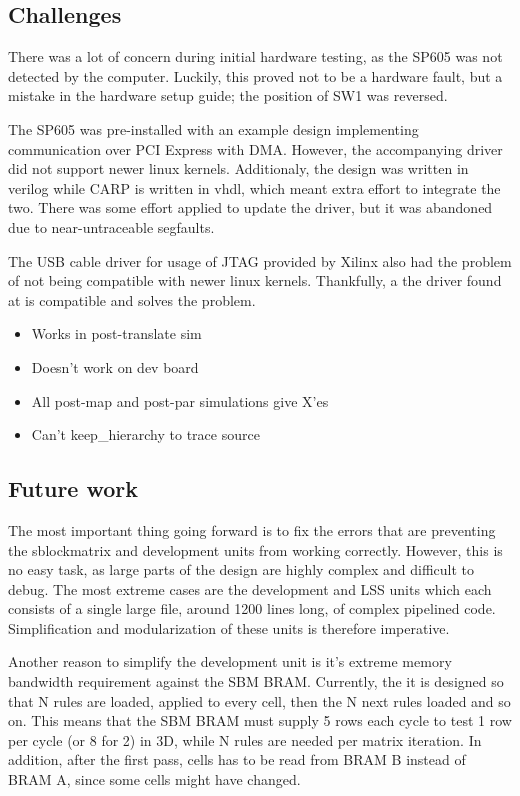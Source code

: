 \subsection{Challenges}
\label{sec:challenges}

There was a lot of concern during initial hardware testing, as the SP605 was not detected by the computer.
Luckily, this proved not to be a hardware fault, but a mistake in the hardware setup guide; the position of SW1 was reversed.

The SP605 was pre-installed with an example design implementing communication over PCI Express with DMA.
However, the accompanying driver did not support newer linux kernels.
Additionaly, the design was written in verilog while CARP is written in vhdl, which meant extra effort to integrate the two.
There was some effort applied to update the driver, but it was abandoned due to near-untraceable segfaults.

The USB cable driver for usage of JTAG provided by Xilinx also had the problem of not being compatible with newer linux kernels.
Thankfully, a the driver found at \cite{usbdriver} is compatible and solves the problem.


\begin{itemize}
    \item Works in post-translate sim
    \item Doesn't work on dev board
    \item All post-map and post-par simulations give X'es
    \item Can't keep\_hierarchy to trace source
\end{itemize}

\subsection{Future work}

The most important thing going forward is to fix the errors that are preventing the sblockmatrix and development units from working correctly.
However, this is no easy task, as large parts of the design are highly complex and difficult to debug.
The most extreme cases are the development and LSS units which each consists of a single large file, around 1200 lines long, of complex pipelined code.
Simplification and modularization of these units is therefore imperative.

Another reason to simplify the development unit is it's extreme memory bandwidth requirement against the SBM BRAM.
Currently, the it is designed so that N rules are loaded, applied to every cell, then the N next rules loaded and so on.
This means that the SBM BRAM must supply 5 rows each cycle to test 1 row per cycle (or 8 for 2) in 3D, while N rules are needed per matrix iteration.
In addition, after the first pass, cells has to be read from BRAM B instead of BRAM A, since some cells might have changed.

